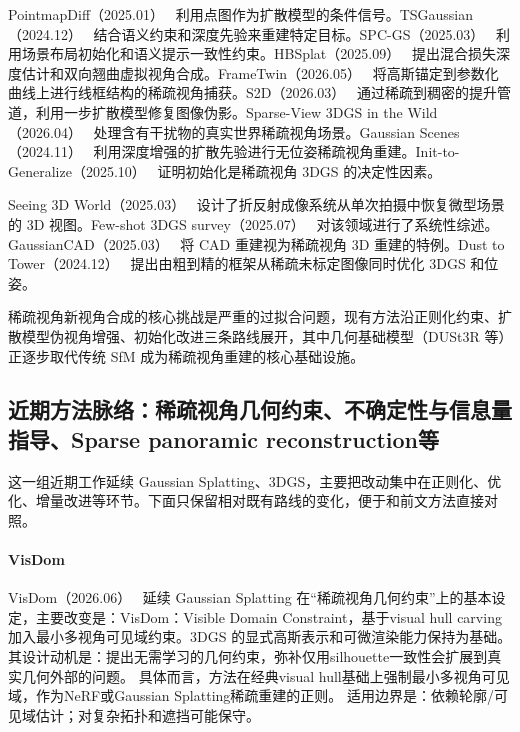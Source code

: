 PointmapDiff（2025.01）~\cite{2501_02913} 利用点图作为扩散模型的条件信号。TSGaussian（2024.12）~\cite{2412_10051} 结合语义约束和深度先验来重建特定目标。SPC-GS（2025.03）~\cite{2503_12535} 利用场景布局初始化和语义提示一致性约束。HBSplat（2025.09）~\cite{2509_24893} 提出混合损失深度估计和双向翘曲虚拟视角合成。FrameTwin（2026.05）~\cite{2605_09362} 将高斯锚定到参数化曲线上进行线框结构的稀疏视角捕获。S2D（2026.03）~\cite{2603_10893} 通过稀疏到稠密的提升管道，利用一步扩散模型修复图像伪影。Sparse-View 3DGS in the Wild（2026.04）~\cite{2604_27422} 处理含有干扰物的真实世界稀疏视角场景。Gaussian Scenes（2024.11）~\cite{2411_15966} 利用深度增强的扩散先验进行无位姿稀疏视角重建。Init-to-Generalize（2025.10）~\cite{2510_17479} 证明初始化是稀疏视角 3DGS 的决定性因素。

Seeing 3D World（2025.03）~\cite{2503_00260} 设计了折反射成像系统从单次拍摄中恢复微型场景的 3D 视图。Few-shot 3DGS survey（2025.07）~\cite{2507_16406} 对该领域进行了系统性综述。GaussianCAD（2025.03）~\cite{2503_05161} 将 CAD 重建视为稀疏视角 3D 重建的特例。Dust to Tower（2024.12）~\cite{2412_19518} 提出由粗到精的框架从稀疏未标定图像同时优化 3DGS 和位姿。

\begin{takeaway}
稀疏视角新视角合成的核心挑战是严重的过拟合问题，现有方法沿正则化约束、扩散模型伪视角增强、初始化改进三条路线展开，其中几何基础模型（DUSt3R 等）正逐步取代传统 SfM 成为稀疏视角重建的核心基础设施。
\end{takeaway}


\subsection{近期方法脉络：稀疏视角几何约束、不确定性与信息量指导、Sparse panoramic reconstruction等}

这一组近期工作延续 Gaussian Splatting、3DGS，主要把改动集中在正则化、优化、增量改进等环节。下面只保留相对既有路线的变化，便于和前文方法直接对照。

\paragraph{VisDom}
VisDom（2026.06）~\cite{2606_20531} 延续 Gaussian Splatting 在“稀疏视角几何约束”上的基本设定，主要改变是：VisDom：Visible Domain Constraint，基于visual hull carving加入最小多视角可见域约束。3DGS 的显式高斯表示和可微渲染能力保持为基础。
其设计动机是：提出无需学习的几何约束，弥补仅用silhouette一致性会扩展到真实几何外部的问题。
具体而言，方法在经典visual hull基础上强制最小多视角可见域，作为NeRF或Gaussian Splatting稀疏重建的正则。
适用边界是：依赖轮廓/可见域估计；对复杂拓扑和遮挡可能保守。

